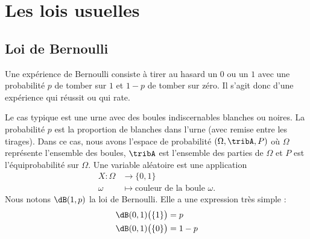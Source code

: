 
\section{Les lois usuelles}

\subsection{Loi de Bernoulli}

Une expérience de Bernoulli consiste à tirer au hasard un \( 0\) ou un \( 1\) avec une probabilité \( p\) de tomber sur \( 1\) et \( 1-p\) de tomber sur zéro. Il s'agit donc d'une expérience qui réussit ou qui rate.

Le cas typique est une urne avec des boules indiscernables blanches ou noires. La probabilité \( p\) est la proportion de blanches dans l'urne (avec remise entre les tirages). Dans ce cas, nous avons l'espace de probabilité \( (\Omega,\tribA,P)\) où \( \Omega\) représente l'ensemble des boules, \( \tribA\) est l'ensemble des parties de \( \Omega\) et \( P\) est l'équiprobabilité sur \( \Omega\). Une variable aléatoire est une application
\begin{equation}
    \begin{aligned}
        X\colon \Omega&\to \{ 0,1 \} \\
        \omega&\mapsto \text{couleur de la boule } \omega.
    \end{aligned}
\end{equation}
Nous notons \( \dB(1,p)\) la loi de Bernoulli. Elle a une expression très simple :
\begin{subequations}
    \begin{align}
        \dB(0,1)\big( \{ 1 \} \big)&=p\\
        \dB(0,1)\big( \{ 0 \} \big)&=1-p
    \end{align}
\end{subequations}

